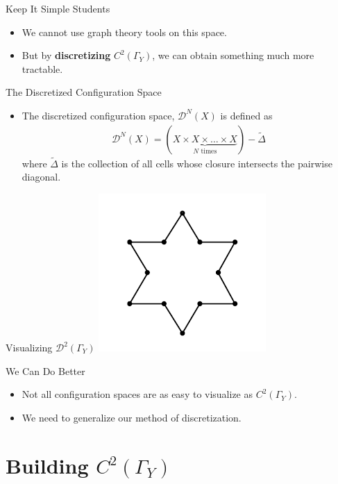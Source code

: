 \documentclass{beamer}
\newcommand{\Y}{\Gamma_Y}
\newcommand{\C}{$C^2(\Y)$}
\begin{document}
\begin{frame}{Keep It Simple Students}
\begin{itemize}
\item We cannot use graph theory tools on this space.\pause
\item But by \textbf{discretizing} \C, we can obtain something much more tractable.
\end{itemize}
\end{frame}

\begin{frame}{The Discretized Configuration Space}
\begin{itemize}
\item The discretized configuration space, $\mathcal{D}^N(X)$ is defined as 
\begin{align*}
\mathcal{D}^N(X) = (\underbrace{X\times X \times \dots \times X}_{N\text{ times}}) - \tilde{\Delta} 
\end{align*}\pause
where $\tilde{\Delta}$ is the collection of all cells whose closure intersects the pairwise diagonal.
\end{itemize}
\end{frame}

\begin{frame}{Visualizing $\mathcal{D}^2(\Y)$}
\centering
\includegraphics[scale=.75]{discretized.jpg}
\end{frame}

\begin{frame}{We Can Do Better}
\begin{itemize}
\item Not all configuration spaces are as easy to visualize as \C.\pause
\item We need to generalize our method of discretization. 
\end{itemize}
\end{frame}

\section{Building \C}
\end{document}
